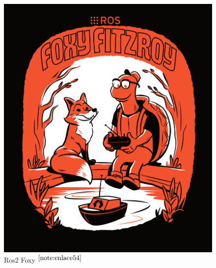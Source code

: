 \begin{figure}[ht!]
	\centering
	\begin{minipage}{0.35\linewidth}
		\centering
		\includegraphics[width=\linewidth]{figs/foxy.png}
		\caption*{\centering Ros2 Foxy $^{\ref{note:enlace54}}$} %
	\end{minipage}
	\hspace{2cm}
	\begin{minipage}{0.35\linewidth}
		\centering

\end{minipage}
\end{figure}
